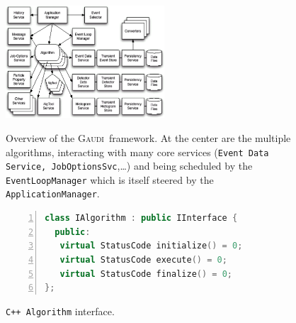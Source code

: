 \documentclass[a4paper]{jpconf}
\newcommand{\gaudi}{\textsc{Gaudi}}
\begin{document}
\begin{figure}[h]
\begin{center}
  \begin{minipage}{17pc}
    \includegraphics[width=14pc]{figs/athena-component-model.pdf}
    \caption{\label{gaudi-com}Overview of the \gaudi\ framework. At the
    center are the multiple algorithms, interacting with many core
    services ({\tt Event Data Service, JobOptionsSvc},\ldots) and
    being scheduled by the {\tt EventLoopManager} which is itself
    steered by the {\tt ApplicationManager}.}
  \end{minipage}\hspace{2pc}%
  \begin{minipage}{15pc}
\begin{lstlisting}[language=c++,
    basicstyle=\tiny,
    frame=trbl,
    numbers=left,
    showstringspaces=false,
    stringstyle=\ttfamily]
class IAlgorithm : public IInterface { 
  public:
   virtual StatusCode initialize() = 0;
   virtual StatusCode execute() = 0;
   virtual StatusCode finalize() = 0;
};
\end{lstlisting}
\caption{\label{gaudi-alg}{\tt C++ Algorithm} interface.}

\end{minipage}
\end{center}
\end{figure}
\end{document}
